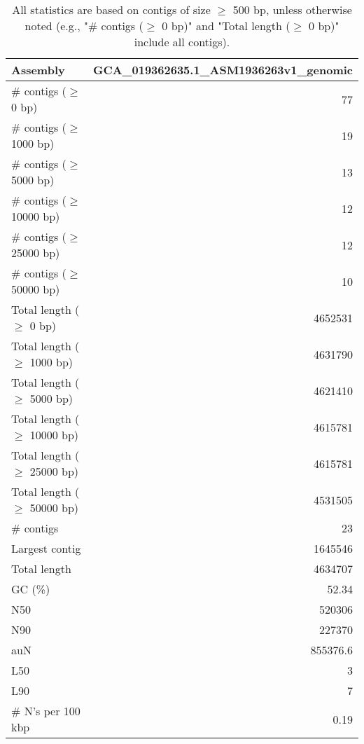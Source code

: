 \documentclass[12pt,a4paper]{article}
\begin{document}
\begin{table}[ht]
\begin{center}
\caption{All statistics are based on contigs of size $\geq$ 500 bp, unless otherwise noted (e.g., "\# contigs ($\geq$ 0 bp)" and "Total length ($\geq$ 0 bp)" include all contigs).}
\begin{tabular}{|l*{1}{|r}|}
\hline
Assembly & GCA\_019362635.1\_ASM1936263v1\_genomic \\ \hline
\# contigs ($\geq$ 0 bp) & 77 \\ \hline
\# contigs ($\geq$ 1000 bp) & 19 \\ \hline
\# contigs ($\geq$ 5000 bp) & 13 \\ \hline
\# contigs ($\geq$ 10000 bp) & 12 \\ \hline
\# contigs ($\geq$ 25000 bp) & 12 \\ \hline
\# contigs ($\geq$ 50000 bp) & 10 \\ \hline
Total length ($\geq$ 0 bp) & 4652531 \\ \hline
Total length ($\geq$ 1000 bp) & 4631790 \\ \hline
Total length ($\geq$ 5000 bp) & 4621410 \\ \hline
Total length ($\geq$ 10000 bp) & 4615781 \\ \hline
Total length ($\geq$ 25000 bp) & 4615781 \\ \hline
Total length ($\geq$ 50000 bp) & 4531505 \\ \hline
\# contigs & 23 \\ \hline
Largest contig & 1645546 \\ \hline
Total length & 4634707 \\ \hline
GC (\%) & 52.34 \\ \hline
N50 & 520306 \\ \hline
N90 & 227370 \\ \hline
auN & 855376.6 \\ \hline
L50 & 3 \\ \hline
L90 & 7 \\ \hline
\# N's per 100 kbp & 0.19 \\ \hline
\end{tabular}
\end{center}
\end{table}
\end{document}
